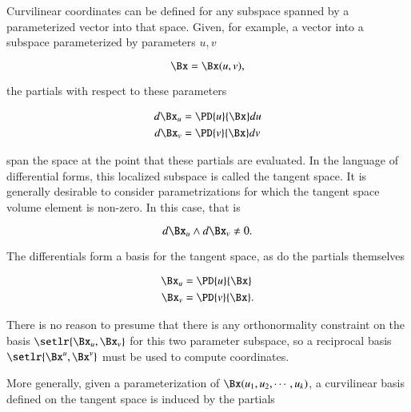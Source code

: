 %
%
Curvilinear coordinates can be defined for any subspace spanned by a parameterized vector into that space.
Given, for example, a vector into a subspace parameterized by parameters \(u,v\)

\begin{dmath}\label{eqn:curvilinear:20}
\Bx = \Bx(u, v),
\end{dmath}

the partials with respect to these parameters

\begin{dmath}\label{eqn:curvilinear:40}
\begin{aligned}
d\Bx_u &= \PD{u}{\Bx} du \\
d\Bx_v &= \PD{v}{\Bx} dv
\end{aligned}
\end{dmath}

span the space at the point that these partials are evaluated.
In the language of differential forms, this localized subspace is called the tangent space.
It is generally desirable to consider parametrizations for which the tangent space volume element is non-zero.
In this case, that is

\begin{dmath}\label{eqn:curvilinear:60}
d\Bx_u \wedge d\Bx_v \ne 0.
\end{dmath}

The differentials form a basis for the tangent space, as do the partials themselves

\begin{dmath}\label{eqn:curvilinear:80}
\begin{aligned}
\Bx_u &= \PD{u}{\Bx} \\
\Bx_v &= \PD{v}{\Bx}.
\end{aligned}
\end{dmath}

There is no reason to presume that there is any orthonormality constraint on the basis \( \setlr{ \Bx_u, \Bx_v } \) for this two parameter subspace, so a reciprocal basis \( \setlr{ \Bx^u, \Bx^v } \)
must be used to compute coordinates.

More generally, given a parameterization of \( \Bx(u_1, u_2, \cdots, u_k) \), a curvilinear basis defined on the tangent space is induced by the partials

